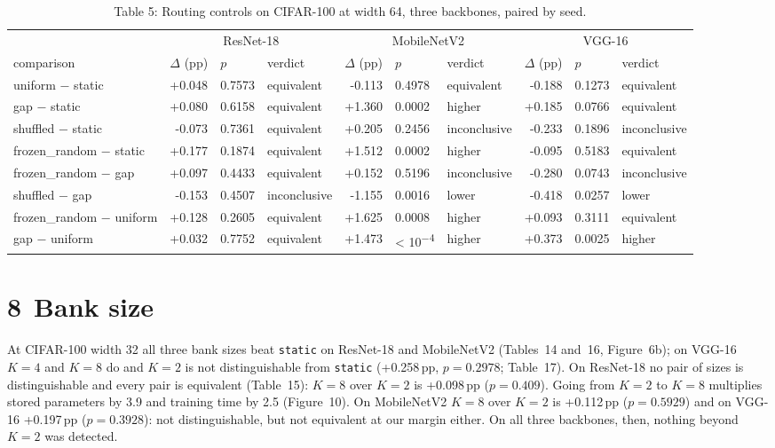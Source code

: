 \documentclass{article}
\begin{document}
\begin{table}
\caption{Table 5: Routing controls on CIFAR-100 at width 64, three backbones,
paired by seed.}

\begin{tabular}{l rll rll rll}
\toprule
& \multicolumn{3}{c}{ResNet-18} & \multicolumn{3}{c}{MobileNetV2} & \multicolumn{3}{c}{VGG-16} \\

comparison & $\Delta$ (pp) & $p$ & verdict & $\Delta$ (pp) & $p$ & verdict & $\Delta$ (pp) & $p$ & verdict \\
\midrule
uniform  −  static & +0.048 & 0.7573 & equivalent & -0.113 & 0.4978 & equivalent & -0.188 & 0.1273 & equivalent \\
gap  −  static & +0.080 & 0.6158 & equivalent & +1.360 & 0.0002 & higher & +0.185 & 0.0766 & equivalent \\
shuffled  −  static & -0.073 & 0.7361 & equivalent & +0.205 & 0.2456 & inconclusive & -0.233 & 0.1896 & inconclusive \\
frozen\_random  −  static & +0.177 & 0.1874 & equivalent & +1.512 & 0.0002 & higher & -0.095 & 0.5183 & equivalent \\
frozen\_random  −  gap & +0.097 & 0.4433 & equivalent & +0.152 & 0.5196 & inconclusive & -0.280 & 0.0743 & inconclusive \\
shuffled  −  gap & -0.153 & 0.4507 & inconclusive & -1.155 & 0.0016 & lower & -0.418 & 0.0257 & lower \\
frozen\_random  −  uniform & +0.128 & 0.2605 & equivalent & +1.625 & 0.0008 & higher & +0.093 & 0.3111 & equivalent \\
gap  −  uniform & +0.032 & 0.7752 & equivalent & +1.473 & < 10\textsuperscript{−4} & higher & +0.373 & 0.0025 & higher \\
\bottomrule
\end{tabular}
\end{table}

\section*{8 Bank size}

At CIFAR-100 width 32 all three bank sizes beat \texttt{static} on
ResNet-18 and MobileNetV2 (Tables~14 and~16,
Figure~6b); on VGG-16 $K=4$ and $K=8$ do and $K=2$ is not
distinguishable from \texttt{static} (+0.258\,pp, $p=0.2978$;
Table~17). On ResNet-18 no pair of sizes is distinguishable and
every pair is equivalent (Table~15): $K=8$ over $K=2$ is
+0.098\,pp ($p=0.409$). Going from $K=2$ to $K=8$ multiplies stored
parameters by 3.9 and training time by 2.5 (Figure~10).
On MobileNetV2 $K=8$ over $K=2$ is +0.112\,pp ($p=0.5929$) and on
VGG-16 +0.197\,pp ($p=0.3928$): not distinguishable, but not
equivalent at our margin either. On all three backbones, then, nothing
beyond $K=2$ was detected.
\end{document}

